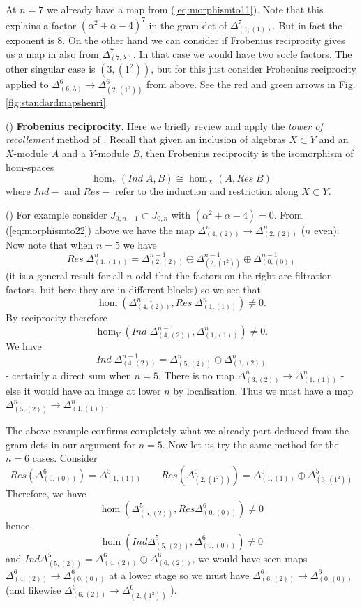 \documentclass{article}
\newcommand{\ppm}[1]{\textcolor{red}{#1}}
\theoremstyle{definition}
\newcommand{\beq}{\begin{equation}}
\newcommand{\eq}{\end{equation}}
\newcommand{\mdef}{\refstepcounter{theorem}       \medskip \noindent ({\bf \thetheorem}) }
\numberwithin{equation}{subsection}
\begin{document}
At $n=7$ we already have a map from (\ref{eq:morphismto11}). 
Note that this explains a factor $(\alpha^2+\alpha-4)^7$ in the gram-det of $\Delta^7_{(1,(1))}$. 
But in fact the exponent is 8. 
On the other hand we can consider if Frobenius reciprocity gives us a map in 
also from $ \Delta^7_{(7,\lambda)}$.  
In that case we would have two socle factors. 
The other singular case is $(3,(1^2))$, but for this just consider Frobenius reciprocity applied to 
$   \Delta^6_{(6,\lambda)} \rightarrow   \Delta^6_{(2,(1^2))}  $ 
from above. 
See the red and green arrows in Fig.\ref{fig:standardmapshenri}. 

\mdef  \label{pa:FR}   {\bf{Frobenius reciprocity}}. 
Here we briefly review and apply the {\em tower of recollement} method of \cite{ToR}. 
Recall that given an inclusion of algebras $ X \subset Y$ and an $X$-module $A$ and
a $Y$-module $B$, 
then Frobenius reciprocity is the isomorphism of hom-spaces
\beq \label{eq:FR} 
\hom_Y(Ind\;A,B) \cong \hom_X(A,Res\;B)
\eq 
where $Ind-$ and $Res-$ refer to the induction and restriction along $ X \subset Y$. 

\mdef   \label{exa:henri1}
For example consider $J_{0,n-1} \subset J_{0,n}$ with $(\alpha^2+\alpha-4)=0$. 
From (\ref{eq:morphismto22}) above we have the map  
$ \Delta^n_{(4,(2))}  \rightarrow \Delta^n_{(2,(2))} $ ($n$ even). 
Now note that when $n=5$ we have 
\[
Res \; \Delta^n_{(1,(1))} =  \Delta^{n-1}_{(2,(2))} \oplus \Delta^{n-1}_{(2,(1^2))} \oplus \Delta^{n-1}_{(0,(0))}
\]
(it is a general result for all $n$ odd that the factors on the right are filtration factors, but here they are in different blocks)
so we see that 
$$
\hom(\Delta^{n-1}_{(4,(2))}, Res \; \Delta^n_{(1,(1))}) \neq 0   .
$$ 
By reciprocity therefore 
$$
\hom_Y(Ind\; \Delta^{n-1}_{(4,(2))},  \Delta^{n}_{(1,(1))}) \neq 0   .
$$ 
We have 
\[
Ind\; \Delta^{n-1}_{(4,(2))} = \Delta^n_{(5,(2))} \oplus \Delta^n_{(3,(2))}
\]
- certainly a direct sum when $n=5$. There is no map 
$ \Delta^n_{(3,(2))} \rightarrow \Delta^n_{(1,(1))} $ 
- else it would have an image at lower $n$ by localisation. 
Thus we must have a map $ \Delta^n_{(5,(2))} \rightarrow \Delta^n_{(1,(1))} $. 

\medskip 

The above example  confirms completely what we already part-deduced from the gram-dets in our argument for $n=5$. 
Now let us try the same method for the $n=6$ cases. 
Consider
\[Res(\Delta^6_{(0,(0))})= \Delta^5_{(1,(1))}  \qquad  Res(\Delta^6_{(2,(1^2))})= \Delta^5_{(1,(1))}\oplus \Delta^5_{(3,(1^2))}\]
Therefore, we have 
\[  \hom(\Delta^5_{(5,(2))}, Res\Delta^6_{(0,(0))})\neq 0\]
hence
\[\hom(Ind\Delta^5_{(5,(2))}, \Delta^6_{(0,(0))})\neq 0\]
and $Ind\Delta^5_{(5,(2))}=\Delta^6_{(4,(2))} \oplus \Delta^6_{(6,(2))}$, we would have seen maps $\Delta^6_{(4,(2))}\to \Delta^6_{(0,(0))}$ at a lower stage so we must have $\Delta^6_{(6,(2))}\to \Delta^6_{(0,(0))}$ (and likewise $\Delta^6_{(6,(2))}\to \Delta^6_{(2,(1^2))}$ ).
\end{document}
